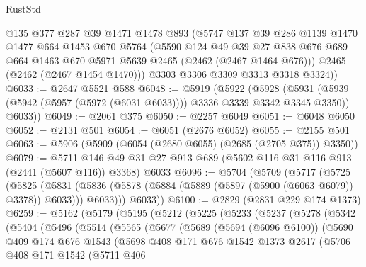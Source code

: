 \begin{lexlean}{RustStd}
\begin{coremodule}
        @135
        @377
        @287
        @39
        @1471
        @1478
        @893
        (@5747
          @137
          @39
          @286
          @1139
          @1470
          @1477
          @664
          @1453
          @670
          @5764
          (@5590
            @124
            @49
            @39
            @27
            @838
            @676
            @689
            @664
            @1463
            @670
            @5971
            @5639
            @2465
            (@2462 (@2467 @1464 @676)))
          @2465
          (@2462 (@2467 @1454 @1470)))
        @3303
        @3306
        @3309
        @3313
        @3318
        @3324))
@6033 := @2647 @5521 @588
@6048 := @5919
    (@5922
      (@5928
        (@5931 (@5939 (@5942 (@5957 (@5972 (@6031 @6033)))) @3336 @3339 @3342 @3345 @3350))
        @6033))
@6049 := @2061 @375
@6050 := @2257 @6049
@6051 := @6048 @6050
@6052 := @2131 @501
@6054 := @6051 (@2676 @6052)
@6055 := @2155 @501
@6063 := @5906 (@5909 (@6054 (@2680 @6055) (@2685 (@2705 @375)) @3350))
@6079 := @5711
    @146
    @49
    @31
    @27
    @913
    @689
    (@5602 @116 @31 @116 @913 (@2441 (@5607 @116)) @3368)
    @6033
@6096 := @5704
    (@5709
      (@5717
        (@5725
          (@5825
            (@5831
              (@5836 (@5878 (@5884 (@5889 (@5897 (@5900 (@6063 @6079)) @3378)) @6033)))
              @6033)))
        @6033))
@6100 := @2829 (@2831 @229 @174 @1373)
@6259 := @5162
    (@5179
      (@5195
        (@5212
          (@5225
            (@5233
              (@5237
                (@5278
                  (@5342
                    (@5404
                      (@5496
                        (@5514
                          (@5565
                            (@5677
                              (@5689
                                (@5694 (@6096 @6100))
                                (@5690
                                  @409
                                  @174
                                  @676
                                  @1543
                                  (@5698
                                    @408
                                    @171
                                    @676
                                    @1542
                                    @1373
                                    @2617
                                    (@5706
                                      @408
                                      @171
                                      @1542
                                      (@5711
                                        @406

\end{coremodule}
\end{lexlean}
